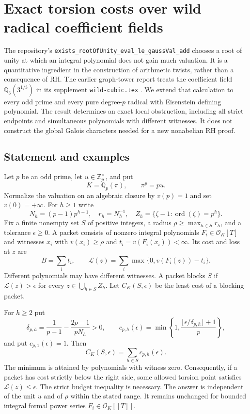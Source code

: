 \section{Exact torsion costs over wild radical coefficient fields}
\label{sec:false-tate}

The repository's
\texttt{exists\_rootOfUnity\_eval\_le\_gaussVal\_add}
chooses a root of unity at which an integral polynomial does not gain
much valuation. It is a quantitative ingredient in the construction of
arithmetic twists, rather than a consequence of RH.
The earlier graph-tower report treats the coefficient field
$\mathbb Q_3(3^{1/3})$ in its supplement \texttt{wild-cubic.tex}
\cite{priorGraph}. We extend that calculation to every odd prime and
every pure degree-$p$ radical with Eisenstein defining polynomial.
The result determines an exact local obstruction, including all strict
endpoints and simultaneous polynomials with different witnesses.
It does not construct the global Galois characters needed for a new
nonabelian RH proof.

\subsection{Statement and examples}
Let $p$ be an odd prime, let $u\in\mathbb Z_p^\times$, and put
\[
 K=\mathbb Q_p(\pi),\qquad \pi^p=pu.
\]
Normalize the valuation on an algebraic closure by $v(p)=1$ and set
$v(0)=+\infty$. For $h\ge1$ write
\[
 N_h=(p-1)p^{h-1},\quad r_h=N_h^{-1},\quad
 Z_h=\{\zeta-1:\operatorname{ord}(\zeta)=p^h\}.
\]
Fix a finite nonempty set $S$ of positive integers, a radius
$\rho\ge\max_{h\in S}r_h$, and a tolerance $\epsilon\ge0$.
A packet consists of nonzero integral polynomials $F_i\in\mathcal O_K[T]$
and witnesses $x_i$ with $v(x_i)\ge\rho$ and
$t_i=v(F_i(x_i))<\infty$. Its cost and loss at $z$ are
\[
 B=\sum_i t_i,\qquad
 \mathcal L(z)=\sum_i\max\{0,v(F_i(z))-t_i\}.
\]
Different polynomials may have different witnesses. A packet blocks $S$
if $\mathcal L(z)>\epsilon$ for every $z\in\bigcup_{h\in S}Z_h$.
Let $C_K(S,\epsilon)$ be the least cost of a blocking packet.

\begin{theorem}\label{thm:false-tate-cost}
For $h\ge2$ put
\[
 \delta_{p,h}=\frac1{p-1}-\frac{2p-1}{pN_h}>0,
 \qquad
 c_{p,h}(\epsilon)=
 \min\left\{1,\frac{\lfloor\epsilon/\delta_{p,h}\rfloor+1}{p}\right\},
\]
and put $c_{p,1}(\epsilon)=1$. Then
\begin{equation}\label{eq:false-tate-cost}
 \boxed{\ C_K(S,\epsilon)=\sum_{h\in S}c_{p,h}(\epsilon).\ }
\end{equation}
The minimum is attained by polynomials with witness zero. Consequently,
if a packet has cost strictly below the right side, some allowed torsion
point satisfies $\mathcal L(z)\le\epsilon$. The strict budget inequality
is necessary. The answer is independent of the unit $u$ and of $\rho$
within the stated range. It remains unchanged for bounded integral
formal power series $F_i\in\mathcal O_K[[T]]$.
\end{theorem}

